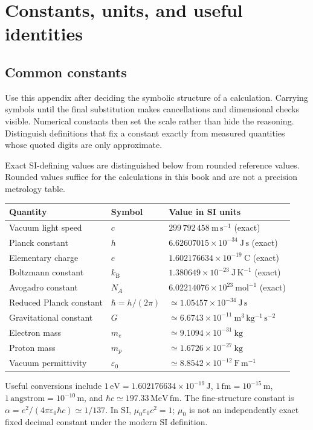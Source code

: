 \documentclass[11pt,oneside]{book}
\newcommand{\kb}{k_{\mathrm B}}
\newcommand{\eps}{\varepsilon_0}
\newcommand{\mun}{\mu_0}
\theoremstyle{reviewstyle}
\begin{document}
\chapter{Constants, units, and useful identities}
\section{Common constants}
Use this appendix after deciding the symbolic structure of a calculation. Carrying symbols until the final substitution makes cancellations and dimensional checks visible. Numerical constants then set the scale rather than hide the reasoning. Distinguish definitions that fix a constant exactly from measured quantities whose quoted digits are only approximate.

Exact SI-defining values are distinguished below from rounded reference values. Rounded values suffice for the calculations in this book and are not a precision metrology table.
\begin{center}
\begin{tabular}{lll}
\toprule
Quantity & Symbol & Value in SI units\\
\midrule
Vacuum light speed & $c$ & $299\,792\,458\ \mathrm{m\,s^{-1}}$ (exact)\\
Planck constant & $h$ & $6.62607015\times10^{-34}\ \mathrm{J\,s}$ (exact)\\
Elementary charge & $e$ & $1.602176634\times10^{-19}\ \mathrm C$ (exact)\\
Boltzmann constant & $\kb$ & $1.380649\times10^{-23}\ \mathrm{J\,K^{-1}}$ (exact)\\
Avogadro constant & $N_A$ & $6.02214076\times10^{23}\ \mathrm{mol^{-1}}$ (exact)\\
Reduced Planck constant & $\hbar=h/(2\pi)$ & $\simeq1.05457\times10^{-34}\ \mathrm{J\,s}$\\
Gravitational constant & $G$ & $\simeq6.6743\times10^{-11}\ \mathrm{m^3\,kg^{-1}\,s^{-2}}$\\
Electron mass & $m_e$ & $\simeq9.1094\times10^{-31}\ \mathrm{kg}$\\
Proton mass & $m_p$ & $\simeq1.6726\times10^{-27}\ \mathrm{kg}$\\
Vacuum permittivity & $\eps$ & $\simeq8.8542\times10^{-12}\ \mathrm{F\,m^{-1}}$\\
\bottomrule
\end{tabular}
\end{center}
Useful conversions include $1\,\mathrm{eV}=1.602176634\times10^{-19}\,\mathrm J$, $1\,\mathrm{fm}=10^{-15}\,\mathrm m$, $1\,\text{angstrom}=10^{-10}\,\mathrm m$, and $\hbar c\simeq197.33\,\mathrm{MeV\,fm}$. The fine-structure constant is $\alpha=e^2/(4\pi\eps\hbar c)\simeq1/137$. In SI, $\mun\eps c^2=1$; $\mun$ is not an independently exact fixed decimal constant under the modern SI definition.
\end{document}
